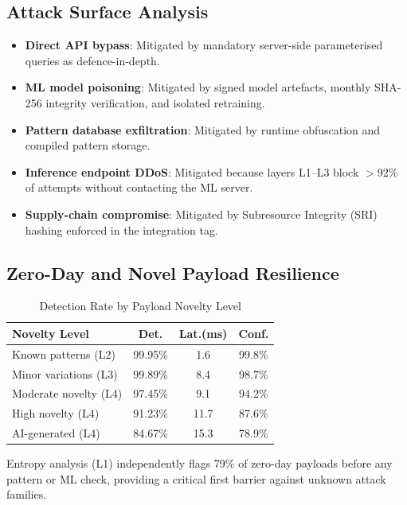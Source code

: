 \documentclass[10pt,twocolumn]{article}
\begin{document}
\subsection{Attack Surface Analysis}

\begin{itemize}[leftmargin=*,itemsep=1pt,topsep=2pt]
  \item \textbf{Direct API bypass}: Mitigated by mandatory server-side
        parameterised queries as defence-in-depth.
  \item \textbf{ML model poisoning}: Mitigated by signed model artefacts,
        monthly SHA-256 integrity verification, and isolated retraining.
  \item \textbf{Pattern database exfiltration}: Mitigated by runtime
        obfuscation and compiled pattern storage.
  \item \textbf{Inference endpoint DDoS}: Mitigated because layers L1--L3
        block $>$92\% of attempts without contacting the ML server.
  \item \textbf{Supply-chain compromise}: Mitigated by Subresource
        Integrity (SRI) hashing enforced in the integration tag.
\end{itemize}

\subsection{Zero-Day and Novel Payload Resilience}

\begin{table}[H]
\centering
\caption{Detection Rate by Payload Novelty Level}
\label{tab:novelty}
\small
\setlength{\tabcolsep}{4pt}
\begin{tabular}{@{}lccc@{}}
\toprule
\textbf{Novelty Level} & \textbf{Det.} & \textbf{Lat.(ms)} & \textbf{Conf.} \\
\midrule
Known patterns (L2)    & 99.95\% &  1.6 & 99.8\% \\
Minor variations (L3)  & 99.89\% &  8.4 & 98.7\% \\
Moderate novelty (L4)  & 97.45\% &  9.1 & 94.2\% \\
High novelty (L4)      & 91.23\% & 11.7 & 87.6\% \\
AI-generated (L4)      & 84.67\% & 15.3 & 78.9\% \\
\bottomrule
\end{tabular}
\end{table}

Entropy analysis (L1) independently flags 79\% of zero-day payloads
before any pattern or ML check, providing a critical first barrier
against unknown attack families.
\end{document}
